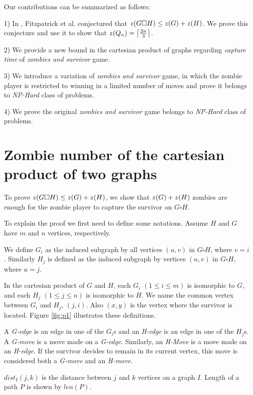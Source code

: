 \documentclass[1p]{elsarticle}
\DeclarePairedDelimiter\ceil{\lceil}{\rceil} \DeclarePairedDelimiter\floor{\lfloor}{\rfloor}
\newcommand{\zn}{\ooalign{$z$\cr\hfil\rule[.5ex]{.2em}{.08ex}\hfil\cr}}
\begin{document}
Our contributions can be summarized as follows:

1) In \cite{Fitz16}, Fitzpatrick et al. conjectured that $\zn(G \square H) \leq \zn(G) + \zn(H)$. We prove this conjecture and
use it to show that $\zn(Q_n) = \ceil*{\frac{2n}{3}}$. 

2) We provide a new bound in the cartesian product of graphs regarding {\it capture time} of {\it zombies and survivor} game.

3) We introduce a variation of {\it zombies and survivor} game, in which the zombie player is restricted to winning in a
limited number of moves and prove it belongs to {\it NP-Hard} class of problems.

4) We prove the original {\it zombies and survivor} game belongs to {\it NP-Hard} class of problems.


\section{Zombie number of the cartesian product of two graphs}\label{conj-proof}

To prove $\zn(G \square H) \leq \zn(G) + \zn(H)$, we show that $\zn(G) + \zn(H)$ zombies are enough for the zombie player to
capture the survivor on $G \square H$.

To explain the proof we first need to define some notations. Assume $H$ and $G$ have $m$ and $n$ vertices,
respectively. 

We define $G_{i}$ as the induced subgraph by all vertices $(u,v)$ in $G \square H$, where $v=i$. Similarly $H_{j}$ is
defined as the induced subgraph by vertices $(u,v)$ in $G \square H$, where $u=j$.

In the cartesian product of $G$ and $H$, each $G_{i}$ $(1 \leq i \leq m)$ is isomorphic to $G$, and each $H_{j}$ $(1
\leq j \leq n)$ is isomorphic to $H$. We name the common vertex between $G_{i}$ and $H_{j}$, $(j,i)$. Also $(x,y)$ is
the vertex where the survivor is located. Figure \ref{fig:p1} illustrates these definitions.

A {\it G-edge} is an edge in one of the $G_{i}$s and an {\it H-edge} is an edge in one of the $H_{j}$s. A {\it G-move}
is a move made on a {\it G-edge}. Similarly, an {\it H-Move} is a move made on an {\it H-edge}. If the survivor decides
to remain in its current vertex, this move is considered both a {\it G-move} and an {\it H-move}. 

$dist_I(j,k)$ is the distance between $j$ and $k$ vertices on a graph $I$. Length of a path $P$ is shown by $len(P)$. 
\end{document}
